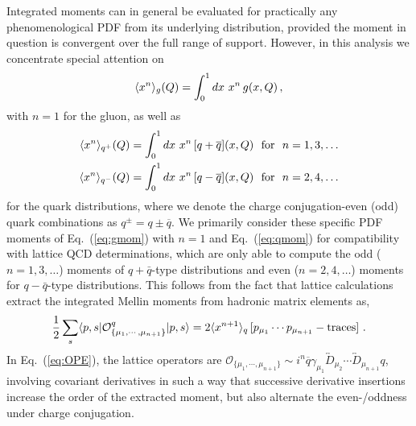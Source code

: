 Integrated moments can in general be evaluated for practically any phenomenological PDF from its underlying distribution,
provided the moment in question is convergent over the full range of support. However, in this analysis we concentrate
special attention on
%
\begin{equation}
\langle x^n\rangle_g(Q)=\int_{0}^{1}dx\ x^{n}\,  g(x,Q) \, ,
\label{eq:gmom}
\end{equation}
%
with $n\!=\!1$ for the gluon, as well as
%
\begin{align}
	\langle x^n\rangle_{q^+}(Q) &= \int_{0}^{1}dx\ x^{n}\,  [q + \overline{q}](x,\Q) \ \ \mathrm{for}\ \ n = 1, 3, \dots \nonumber \\
%
	\langle x^n\rangle_{q^-}(Q) &= \int_{0}^{1}dx\ x^{n}\,  [q - \overline{q}](x,\Q) \ \ \mathrm{for}\ \ n = 2, 4, \dots
\label{eq:qmom}
\end{align}
%
for the quark distributions, where we denote the charge conjugation-even (odd) quark combinations as $q^\pm = q \pm \overline{q}$.
%	
We primarily consider these specific PDF moments of Eq.~(\ref{eq:gmom}) with $n\!=\!1$ and Eq.~(\ref{eq:qmom}) for compatibility with lattice QCD determinations,
which are only able to compute the odd ($n\! =\! 1, 3, \dots$) moments of $q\!+\!\bar{q}$-type distributions and even ($n\! =\! 2, 4, \dots$) moments
for $q\!-\!\bar{q}$-type distributions.
%
This follows from the fact that lattice calculations extract the integrated Mellin moments from hadronic matrix elements as,
%
%
\begin{equation}
	\frac{1}{2}\sum_{s}\langle p,s|\mathcal{O}_{\{\mu_{1},\cdots,\mu_{n+1}\}}^{q}|p,s\rangle = 2 \langle x^{n+1} \rangle_{q}\,[p_{\mu_{1}}\cdots p_{\mu_{n+1}}-{\rm traces}]\ .
\label{eq:OPE}
\end{equation}
%
%
In Eq.~(\ref{eq:OPE}), the lattice operators are
$\mathcal{O}_{\{\mu_{1},\cdots,\mu_{n+1}\}}\! \sim\! i^n \overline{q} \gamma_{\mu_1} \overleftrightarrow{D}_{\mu_2} \cdots \overleftrightarrow{D}_{\mu_{n+1}} q$, involving
covariant derivatives in such a way that successive derivative insertions increase the order of the extracted moment, but also alternate the even-/oddness under charge conjugation.



